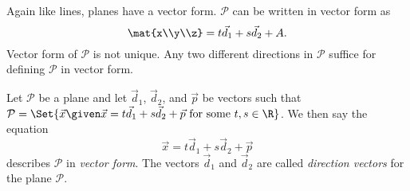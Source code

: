 Again like lines, planes have a vector form.  $\mathcal P$ can be written in vector form as
\[
	\mat{x\\y\\z} = t\vec d_1+s\vec d_2+A.
\]
Vector form of $\mathcal P$ is not unique.  Any two different directions in $\mathcal P$
suffice for defining $\mathcal P$ in vector form.

\begin{center}
\end{center}

\begin{definition}
	Let $\mathcal P$ be a plane and let $\vec d_1$, $\vec d_2$, and $\vec p$ be vectors such
	that $\mathcal P=\Set{\vec x\given \vec x=t\vec d_1+s\vec d_2+\vec p\text{ for some }t,s\in\R}$.
	We then say the equation
	\[
		\vec x=t\vec d_1+s\vec d_2+\vec p
	\]
	describes $\mathcal P$ in \emph{vector form}.
	The vectors $\vec d_1$
	and $\vec d_2$ are called \emph{direction vectors} for the plane $\mathcal P$.
\end{definition}

